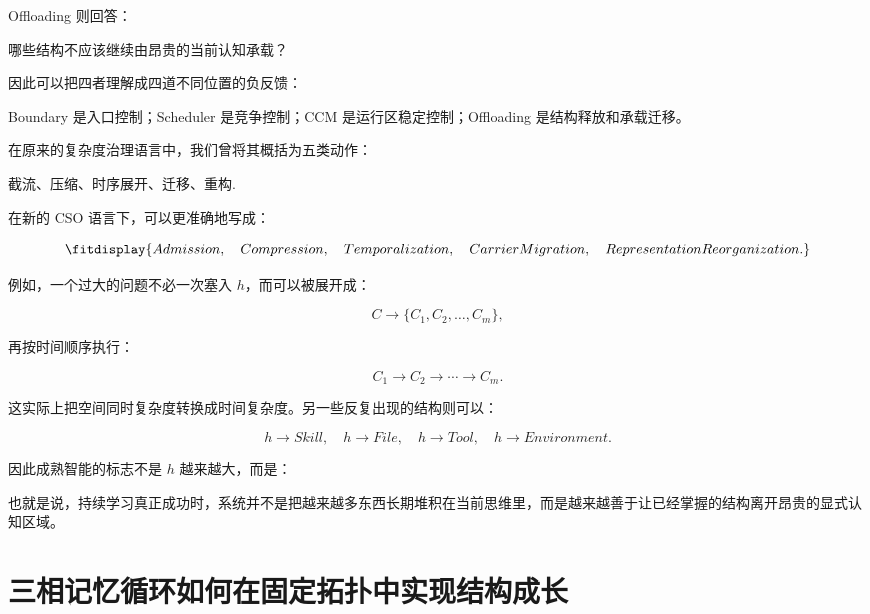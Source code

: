 Offloading 则回答：

\begin{statementbox}
哪些结构不应该继续由昂贵的当前认知承载？
\end{statementbox}

因此可以把四者理解成四道不同位置的负反馈：

\begin{statementbox}
\centering
{}
\end{statementbox}

Boundary 是入口控制；Scheduler 是竞争控制；CCM 是运行区稳定控制；Offloading 是结构释放和承载迁移。

在原来的复杂度治理语言中，我们曾将其概括为五类动作：

\begin{conclusion}
截流、压缩、时序展开、迁移、重构.
\end{conclusion}

在新的 CSO 语言下，可以更准确地写成：

\[
\fitdisplay{
Admission,
\quad
Compression,
\quad
Temporalization,
\quad
CarrierMigration,
\quad
RepresentationReorganization.
}
\]

例如，一个过大的问题不必一次塞入 $h$，而可以被展开成：

\[
C
\rightarrow
\{C_1,C_2,\ldots,C_m\},
\]

再按时间顺序执行：

\[
C_1
\rightarrow
C_2
\rightarrow
\cdots
\rightarrow
C_m.
\]

这实际上把空间同时复杂度转换成时间复杂度。另一些反复出现的结构则可以：

\[
h
\rightarrow
Skill,
\quad
h
\rightarrow
File,
\quad
h
\rightarrow
Tool,
\quad
h
\rightarrow
Environment.
\]

因此成熟智能的标志不是 $h$ 越来越大，而是：

\begin{statementbox}
\centering
{}
\end{statementbox}

也就是说，持续学习真正成功时，系统并不是把越来越多东西长期堆积在当前思维里，而是越来越善于让已经掌握的结构离开昂贵的显式认知区域。

\section{三相记忆循环如何在固定拓扑中实现结构成长}

